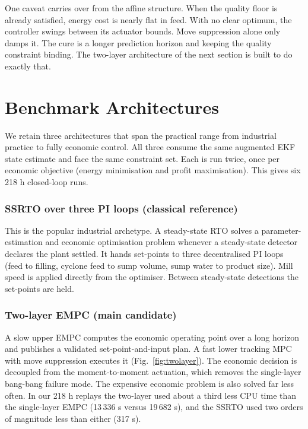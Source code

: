 \documentclass[conference]{IEEEtran}
\begin{document}
One caveat carries over from the affine structure. When the quality floor
is already satisfied, energy cost is nearly flat in feed. With no clear
optimum, the controller swings between its actuator bounds. Move
suppression alone only damps it. The cure is a longer prediction horizon
and keeping the quality constraint binding. The two-layer architecture of
the next section is built to do exactly that.

\section{Benchmark Architectures}

We retain three architectures that span the practical range from industrial
practice to fully economic control. All three consume the same augmented
EKF state estimate and face the same constraint set. Each is run twice,
once per economic objective (energy minimisation and profit maximisation).
This gives six 218 h closed-loop runs.

\subsubsection{SSRTO over three PI loops (classical reference)}
This is the popular industrial archetype. A steady-state RTO solves a
parameter-estimation and economic optimisation problem whenever a
steady-state detector declares the plant settled. It hands set-points to
three decentralised PI loops (feed to filling, cyclone feed to sump
volume, sump water to product size). Mill speed is applied directly from
the optimiser. Between steady-state detections the set-points are held.

\subsubsection{Two-layer EMPC (main candidate)}
A slow upper EMPC computes the economic operating point over a long
horizon and publishes a validated set-point-and-input plan. A fast lower
tracking MPC with move suppression executes it (Fig.~\ref{fig:twolayer}).
The economic decision is decoupled from the moment-to-moment actuation,
which removes the single-layer bang-bang failure mode. The expensive
economic problem is also solved far less often. In our 218 h replays the
two-layer used about a third less CPU time than the single-layer EMPC
(13\,336 s versus 19\,682 s), and the SSRTO used two orders of magnitude
less than either (317 s).
\end{document}
